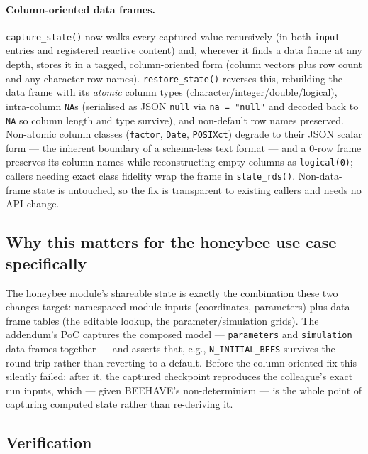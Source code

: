 \documentclass[12pt,a4paper]{article}
\begin{document}
\paragraph{Column-oriented data frames.} \texttt{capture\_state()} now walks
every captured value recursively (in both \texttt{input} entries and registered
reactive content) and, wherever it finds a data frame at any depth, stores it in
a tagged, column-oriented form (column vectors plus row count and any character
row names). \texttt{restore\_state()} reverses this, rebuilding the data frame
with its \emph{atomic} column types (character/integer/double/logical),
intra-column \texttt{NA}s (serialised as JSON \texttt{null} via
\texttt{na = "null"} and decoded back to \texttt{NA} so column length and type
survive), and non-default row names preserved. Non-atomic column classes
(\texttt{factor}, \texttt{Date}, \texttt{POSIXct}) degrade to their JSON scalar
form --- the inherent boundary of a schema-less text format --- and a 0-row frame
preserves its column names while reconstructing empty columns as
\texttt{logical(0)}; callers needing exact class fidelity wrap the frame in
\texttt{state\_rds()}. Non-data-frame state is untouched, so the fix is
transparent to existing callers and needs no API change.

\subsection{Why this matters for the honeybee use case specifically}

The honeybee module's shareable state is exactly the combination these two
changes target: namespaced module inputs (coordinates, parameters) plus
data-frame tables (the editable lookup, the parameter/simulation grids). The
addendum's PoC captures the composed model --- \texttt{parameters} and
\texttt{simulation} data frames together --- and asserts that, e.g.,
\texttt{N\_INITIAL\_BEES} survives the round-trip rather than reverting to a
default. Before the column-oriented fix this silently failed; after it, the
captured checkpoint reproduces the colleague's exact run inputs, which --- given
BEEHAVE's non-determinism --- is the whole point of capturing computed state
rather than re-deriving it.

\subsection{Verification}
\end{document}
